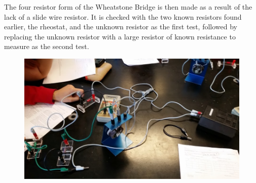 \documentclass[11pt, titlepage]{article}
\begin{document}
The four resistor form of the Wheatstone Bridge is then made as a result of the lack of a slide wire resistor. It is checked with the two known resistors found earlier, the rheostat, and the unknown resistor as the first test, followed by replacing the unknown resistor with a large resistor of known resistance to measure as the second test.

\begin{figure}[h]
\centering
\hspace*{0cm}
\includegraphics[scale=0.7, angle=270]{lab13.jpg}
\vspace*{0cm}
\end{figure}
\end{document}
